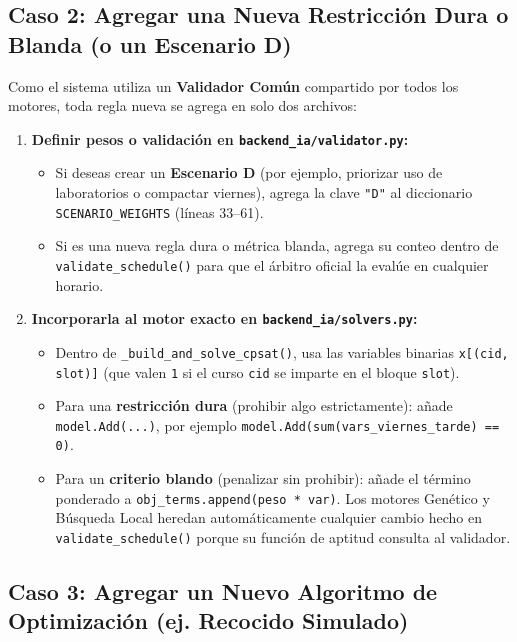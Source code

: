 \documentclass[11pt,letterpaper]{article}
\newcommand{\subseccionUPV}[1]{%
    \subsection{\texorpdfstring{\textcolor{upvazul}{#1}}{#1}}%
}
\begin{document}
\subseccionUPV{Caso 2: Agregar una Nueva Restricción Dura o Blanda (o un Escenario D)}

Como el sistema utiliza un \textbf{Validador Común} compartido por todos los motores, toda regla nueva se agrega en solo dos archivos:
\begin{enumerate}
    \item \textbf{Definir pesos o validación en \texttt{backend\_ia/validator.py}:}
    \begin{itemize}
        \item Si deseas crear un \textbf{Escenario D} (por ejemplo, priorizar uso de laboratorios o compactar viernes), agrega la clave \texttt{"D"} al diccionario \texttt{SCENARIO\_WEIGHTS} (líneas 33--61).
        \item Si es una nueva regla dura o métrica blanda, agrega su conteo dentro de \texttt{validate\_schedule()} para que el árbitro oficial la evalúe en cualquier horario.
    \end{itemize}
    \item \textbf{Incorporarla al motor exacto en \texttt{backend\_ia/solvers.py}:}
    \begin{itemize}
        \item Dentro de \texttt{\_build\_and\_solve\_cpsat()}, usa las variables binarias \texttt{x[(cid, slot)]} (que valen \texttt{1} si el curso \texttt{cid} se imparte en el bloque \texttt{slot}).
        \item Para una \textbf{restricción dura} (prohibir algo estrictamente): añade \texttt{model.Add(...)}, por ejemplo \texttt{model.Add(sum(vars\_viernes\_tarde) == 0)}.
        \item Para un \textbf{criterio blando} (penalizar sin prohibir): añade el término ponderado a \texttt{obj\_terms.append(peso * var)}. Los motores Genético y Búsqueda Local heredan automáticamente cualquier cambio hecho en \texttt{validate\_schedule()} porque su función de aptitud consulta al validador.
    \end{itemize}
\end{enumerate}

\subseccionUPV{Caso 3: Agregar un Nuevo Algoritmo de Optimización (ej. Recocido Simulado)}
\end{document}
